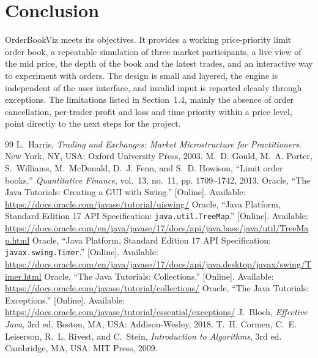 \documentclass[12pt,a4paper,openany,oneside]{report}
\newcommand{\projectTitle}{OrderBookViz}
\newcommand{\code}[1]{\texttt{#1}}
\begin{document}
\section*{Conclusion}

\projectTitle{} meets its objectives. It provides a working price-priority limit order book, a repeatable simulation of three market participants, a live view of the mid price, the depth of the book and the latest trades, and an interactive way to experiment with orders. The design is small and layered, the engine is independent of the user interface, and invalid input is reported cleanly through exceptions. The limitations listed in Section~1.4, mainly the absence of order cancellation, per-trader profit and loss and time priority within a price level, point directly to the next steps for the project.

\renewcommand{\bibname}{References}
\clearpage
{}
\begin{thebibliography}{99}
\setlength{\itemsep}{4pt}
 L.~Harris, \emph{Trading and Exchanges: Market Microstructure for Practitioners}. New York, NY, USA: Oxford University Press, 2003.
 M.~D. Gould, M.~A. Porter, S.~Williams, M.~McDonald, D.~J. Fenn, and S.~D. Howison, ``Limit order books,'' \emph{Quantitative Finance}, vol.~13, no.~11, pp. 1709--1742, 2013.
 Oracle, ``The Java Tutorials: Creating a GUI with Swing.'' [Online]. Available: \url{https://docs.oracle.com/javase/tutorial/uiswing/}
 Oracle, ``Java Platform, Standard Edition 17 API Specification: \code{java.util.TreeMap}.'' [Online]. Available: \url{https://docs.oracle.com/en/java/javase/17/docs/api/java.base/java/util/TreeMap.html}
 Oracle, ``Java Platform, Standard Edition 17 API Specification: \code{javax.swing.Timer}.'' [Online]. Available: \url{https://docs.oracle.com/en/java/javase/17/docs/api/java.desktop/javax/swing/Timer.html}
 Oracle, ``The Java Tutorials: Collections.'' [Online]. Available: \url{https://docs.oracle.com/javase/tutorial/collections/}
 Oracle, ``The Java Tutorials: Exceptions.'' [Online]. Available: \url{https://docs.oracle.com/javase/tutorial/essential/exceptions/}
 J.~Bloch, \emph{Effective Java}, 3rd ed. Boston, MA, USA: Addison-Wesley, 2018.
 T.~H. Cormen, C.~E. Leiserson, R.~L. Rivest, and C.~Stein, \emph{Introduction to Algorithms}, 3rd ed. Cambridge, MA, USA: MIT Press, 2009.
\end{thebibliography}
\end{document}
